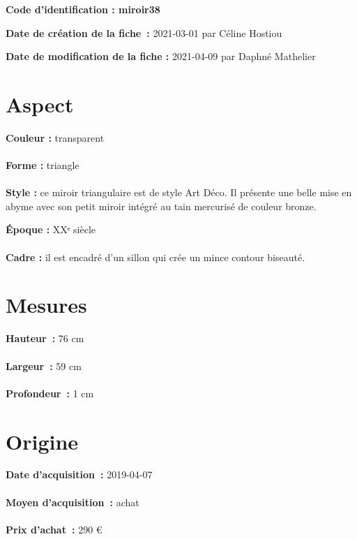 
     {\bf \huge Code d’identification : miroir38} \\
    \newline \hr \begin{center} 
       
    \end{center} 
    \begin{itemize}
    
    \footnotesize {\item {\bf Date de création de la fiche :} 2021-03-01
    {par Céline Hostiou}} 
    \footnotesize {\item {\bf Date de modification de la fiche :} 2021-04-09
    {par Daphné Mathelier} \\}
    \end{itemize}
   \hr 
    \section* {Aspect} 
    {\bf \large Couleur :} transparent
    \\ \\ {\bf \large Forme :} triangle 
    \\ \\ {\bf \large Style :} 
            ce miroir triangulaire est de style Art Déco. Il présente une
            belle mise en abyme avec son petit miroir intégré au tain mercurisé de couleur
            bronze.
         
        {\bf \large Époque :} XXᵉ siècle 
    \\ \\ {\bf \large Cadre :} il est encadré d’un sillon qui crée un mince contour biseauté.
         
    \section* {Mesures}
     {\bf \large Hauteur :} 76 cm
   \\ \\ {\bf \large Largeur :} 59 cm 
   \\ \\ {\bf \large Profondeur :} 1 cm  
  
    \section* {Origine}
    {\bf \large Date d’acquisition :} 2019-04-07 \\ \\
    {\bf \large Moyen d’acquisition :} achat \\ \\ {\bf \large Prix d’achat :}
        290 € 
      
